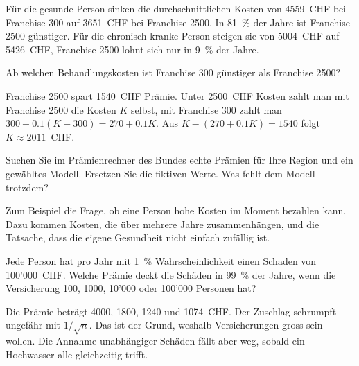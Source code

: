 Für die gesunde Person sinken die durchschnittlichen Kosten von 4559~CHF bei Franchise 300 auf 3651~CHF bei Franchise 2500. In 81~\% der Jahre ist Franchise 2500 günstiger. Für die chronisch kranke Person steigen sie von 5004~CHF auf 5426~CHF, Franchise 2500 lohnt sich nur in 9~\% der Jahre.

\begin{myexercise}[Schwelle]
	Ab welchen Behandlungskosten ist Franchise 300 günstiger als Franchise 2500?
	\begin{myanswer}
		Franchise 2500 spart 1540~CHF Prämie. Unter 2500~CHF Kosten zahlt man mit Franchise 2500 die Kosten $K$ selbst, mit Franchise 300 zahlt man $300 + 0.1(K-300) = 270 + 0.1K$. Aus $K - (270 + 0.1K) = 1540$ folgt $K \approx 2011$~CHF.
	\end{myanswer}
\end{myexercise}

\begin{myexercise}
	Suchen Sie im Prämienrechner des Bundes echte Prämien für Ihre Region und ein gewähltes Modell. Ersetzen Sie die fiktiven Werte. Was fehlt dem Modell trotzdem?
	\begin{myanswer}
		Zum Beispiel die Frage, ob eine Person hohe Kosten im Moment bezahlen kann. Dazu kommen Kosten, die über mehrere Jahre zusammenhängen, und die Tatsache, dass die eigene Gesundheit nicht einfach zufällig ist.
	\end{myanswer}
\end{myexercise}

\begin{mychallenge}
	Jede Person hat pro Jahr mit 1~\% Wahrscheinlichkeit einen Schaden von 100'000~CHF. Welche Prämie deckt die Schäden in 99~\% der Jahre, wenn die Versicherung 100, 1000, 10'000 oder 100'000 Personen hat?
	\begin{myanswer}
		Die Prämie beträgt 4000, 1800, 1240 und 1074~CHF. Der Zuschlag schrumpft ungefähr mit $1/\sqrt{n}$. Das ist der Grund, weshalb Versicherungen gross sein wollen. Die Annahme unabhängiger Schäden fällt aber weg, sobald ein Hochwasser alle gleichzeitig trifft.
	\end{myanswer}
\end{mychallenge}
